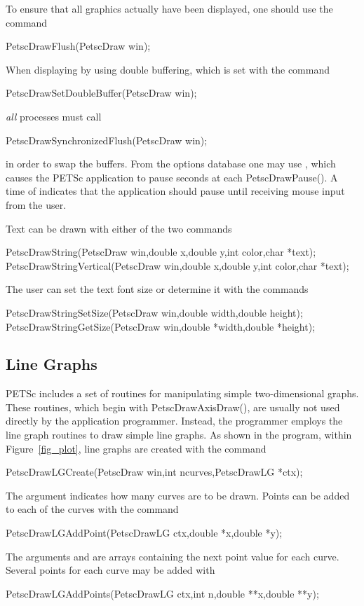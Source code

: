 {{{To ensure that all graphics actually have been displayed, one should use 
 the
command 
\begin{tabbing}
  PetscDrawFlush(PetscDraw win);
\end{tabbing}
When displaying by using double buffering, which is set with the
command  
\begin{tabbing}
  PetscDrawSetDoubleBuffer(PetscDraw win);
\end{tabbing}
{\em all} processes must call
\begin{tabbing}
  PetscDrawSynchronizedFlush(PetscDraw win);
\end{tabbing}
in order to swap the buffers. From the options database one may use 
 , which  causes the PETSc application 
to pause  seconds at each PetscDrawPause(). A time of 
indicates that the application should pause until receiving mouse 
input from the user.

Text can be drawn with either of the two 
commands 
\begin{tabbing}
  PetscDrawString(PetscDraw win,double x,double y,int color,char *text);\\
  PetscDrawStringVertical(PetscDraw win,double x,double y,int color,char *text);
\end{tabbing}
The user can set the text font size or determine it with the 
commands 
\begin{tabbing}
  PetscDrawStringSetSize(PetscDraw win,double width,double height);\\
  PetscDrawStringGetSize(PetscDraw win,double *width,double *height);
\end{tabbing}

\subsection{Line Graphs}
PETSc includes a set of routines for manipulating simple two-dimensional
graphs. These routines, which begin with PetscDrawAxisDraw(), are usually 
not used directly by the application programmer.  Instead, the programmer 
employs the line graph routines to draw simple line graphs.
As shown in the program, within Figure~\ref{fig_plot}, line graphs 
are created with the command  
\begin{tabbing}
  PetscDrawLGCreate(PetscDraw win,int ncurves,PetscDrawLG *ctx);
\end{tabbing}
The argument  indicates how many curves are to be drawn.
Points can be added to each of the curves with the 
command 
\begin{tabbing}
  PetscDrawLGAddPoint(PetscDrawLG ctx,double *x,double *y);
\end{tabbing}
The arguments  and  are arrays containing the next 
point value for each curve.
Several points for each curve may be added with 
\begin{tabbing}
  PetscDrawLGAddPoints(PetscDrawLG ctx,int n,double **x,double **y);
\end{tabbing}

}}}

